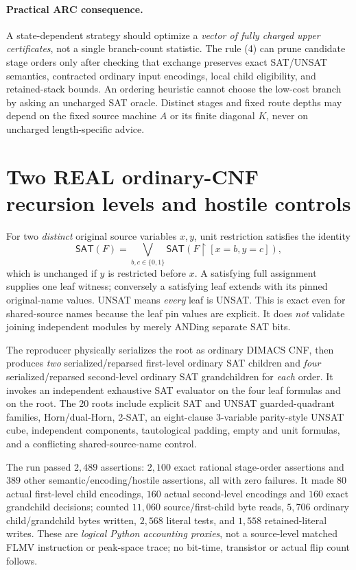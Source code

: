 \documentclass[11pt]{article}
\newcommand{\SAT}{\mathsf{SAT}}
\begin{document}
\paragraph{Practical ARC consequence.}
A state-dependent strategy should
optimize a \emph{vector of fully charged upper certificates},
not a single branch-count statistic. The rule (4) can prune candidate
stage orders only after checking that exchange preserves exact SAT/UNSAT
semantics, contracted ordinary input encodings, local child eligibility,
and retained-stack bounds. An ordering heuristic cannot choose the
low-cost branch by asking an uncharged SAT oracle. Distinct stages and
fixed route depths may depend on the fixed source machine $A$ or its
finite diagonal $K$, never on uncharged length-specific advice.

\section{Two REAL ordinary-CNF recursion levels and hostile controls}
For two \emph{distinct} original source variables $x,y$, unit
restriction satisfies the identity
\[
 \SAT(F)=\bigvee_{b,c\in\{0,1\}}
            \SAT(F\restriction[x=b,y=c]),\tag{6}
\]
which is unchanged if $y$ is restricted before $x$. A satisfying
full assignment supplies one leaf witness; conversely a satisfying
leaf extends with its pinned original-name values. UNSAT means
\emph{every} leaf is UNSAT. This is exact even for shared-source
names because the leaf pin values are explicit. It does \emph{not}
validate joining independent modules by merely ANDing separate SAT bits.

The reproducer physically serializes the root as ordinary DIMACS CNF,
then produces \emph{two} serialized/reparsed first-level ordinary SAT
children and \emph{four} serialized/reparsed second-level ordinary SAT
grandchildren for \emph{each} order. It invokes an independent exhaustive
SAT evaluator on the four leaf formulas and on the root.
The 20 roots include explicit SAT and UNSAT guarded-quadrant families,
Horn/dual-Horn, 2-SAT, an eight-clause 3-variable parity-style UNSAT
cube, independent components, tautological padding, empty and unit
formulas, and a conflicting shared-source-name control.

The run passed $2{,}489$ assertions: $2{,}100$ exact rational stage-order
assertions and $389$ other semantic/encoding/hostile assertions, all with
zero failures. It made $80$ actual first-level child encodings, $160$
actual second-level encodings and $160$ exact grandchild decisions;
counted $11{,}060$ source/first-child byte reads, $5{,}706$ ordinary
child/grandchild bytes written, $2{,}568$ literal tests, and $1{,}558$
retained-literal writes. These are \emph{logical Python accounting
proxies}, not a source-level matched FLMV instruction or peak-space
trace; no bit-time, transistor or actual flip count follows.
\end{document}
